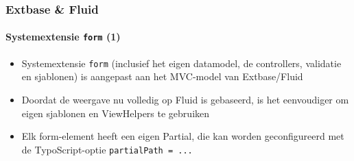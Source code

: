\begin{frame}[fragile]
	\frametitle{Extbase \& Fluid}
	\framesubtitle{Systemextensie \texttt{form} (1)}

	\begin{itemize}

		\item Systemextensie \texttt{form} (inclusief het eigen datamodel, de controllers, validatie 
			en sjablonen) is aangepast aan het MVC-model van Extbase/Fluid

		\item Doordat de weergave nu volledig op Fluid is gebaseerd, is het eenvoudiger 
			om eigen sjablonen en ViewHelpers te gebruiken

		\item Elk form-element heeft een eigen Partial, die kan worden geconfigureerd met de 
			TypoScript-optie \texttt{partialPath = ...}

	\end{itemize}

\end{frame}


